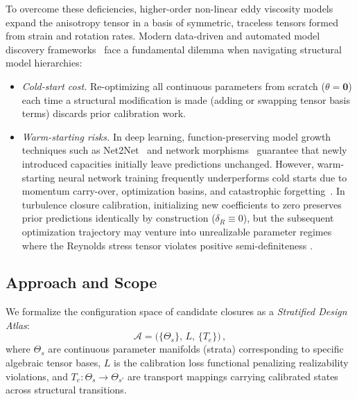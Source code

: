 \documentclass[preprint,aps,prb,longbibliography,superscriptaddress]{revtex4-2}
\begin{document}
To overcome these deficiencies, higher-order non-linear eddy viscosity models
\cite{Pope1975,Pope2000,Craft1996,Wallin2000} expand the anisotropy tensor in a basis of
symmetric, traceless tensors formed from strain and rotation rates. Modern
data-driven and automated model discovery frameworks~\cite{Duraisamy2019,Ling2016,Weatheritt2016,Schmelzer2020,Parish2016,Wu2018,Kochkov2021,List2022}
face a fundamental dilemma when navigating structural model hierarchies:
\begin{itemize}
  \item \textit{Cold-start cost.} Re-optimizing all continuous parameters from
    scratch ($\theta = \mathbf{0}$) each time a structural modification is made
    (adding or swapping tensor basis terms) discards prior calibration work.
  \item \textit{Warm-starting risks.} In deep learning, function-preserving model
    growth techniques such as Net2Net~\cite{Chen2016} and network morphisms~\cite{Wei2016}
    guarantee that newly introduced capacities initially leave predictions unchanged.
    However, warm-starting neural network training frequently underperforms cold
    starts due to momentum carry-over, optimization basins, and catastrophic forgetting~\cite{Ash2020,Hinton2015,Frankle2018,Draxler2018,Garipov2018,Ainsworth2022,Bengio2009}.
    In turbulence closure calibration, initializing new coefficients to zero
    preserves prior predictions identically by construction ($\delta_R \equiv 0$),
    but the subsequent optimization trajectory may venture into unrealizable parameter
    regimes where the Reynolds stress tensor violates positive semi-definiteness
    \cite{Schumann1977,Lumley1978}.
\end{itemize}

\subsection{Approach and Scope}\label{sec:scope}

We formalize the configuration space of candidate closures as a
\emph{Stratified Design Atlas}:
\begin{equation}\label{eq:atlas}
  \mathcal{A} = \bigl(\{\Theta_s\},\, L,\, \{T_e\}\bigr)\,,
\end{equation}
where $\Theta_s$ are continuous parameter manifolds (strata) corresponding
to specific algebraic tensor bases, $L$ is the calibration loss functional
penalizing realizability violations, and $T_e: \Theta_s \to \Theta_{s'}$ are
transport mappings carrying calibrated states across structural transitions.
\end{document}
